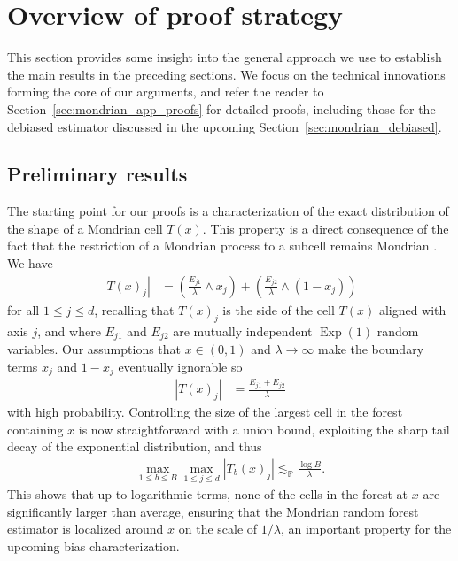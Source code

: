 \documentclass[11pt,lof]{puthesis}
\renewcommand{\P}{\ensuremath{\mathbb{P}}}
\DeclareMathOperator{\Exp}{Exp}
\theoremstyle{break}
\theoremstyle{proof}
\begin{document}
\section{Overview of proof strategy}%
\label{sec:mondrian_overview_proofs}

This section provides some insight into the general approach we use to
establish the main results in the preceding sections. We focus on the technical
innovations forming the core of our arguments, and refer the reader to
Section~\ref{sec:mondrian_app_proofs} for detailed proofs, including those for
the
debiased estimator discussed in the upcoming
Section~\ref{sec:mondrian_debiased}.

\subsection*{Preliminary results}

The starting point for our proofs is a characterization of the exact
distribution of the shape of a Mondrian cell $T(x)$. This property is a direct
consequence of the fact that the restriction of a Mondrian process to a subcell
remains Mondrian \citep[Fact~2]{mourtada2020minimax}. We have
%
\begin{align*}
|T(x)_j|
&= \left( \frac{E_{j1}}{\lambda} \wedge x_j \right)
+ \left( \frac{E_{j2}}{\lambda} \wedge (1-x_j) \right)
\end{align*}
%
for all $1 \leq j \leq d$, recalling that $T(x)_j$ is the side of the cell
$T(x)$ aligned with axis $j$, and where $E_{j1}$ and $E_{j2}$ are mutually
independent $\Exp(1)$ random variables. Our assumptions that $x \in (0,1)$ and
$\lambda \to \infty$ make the boundary terms $x_j$ and $1-x_j$
eventually ignorable so
%
\begin{align*}
|T(x)_j| &= \frac{E_{j1} + E_{j2}}{\lambda}
\end{align*}
%
with high probability. Controlling the size of the largest cell in the forest
containing $x$ is now straightforward with a union bound, exploiting the sharp
tail decay of the exponential distribution, and thus
%
\begin{align*}
\max_{1 \leq b \leq B} \max_{1 \leq j \leq d} |T_b(x)_j|
\lesssim_\P \frac{\log B}{\lambda}.
\end{align*}
%
This shows that up to logarithmic terms, none of the cells in the forest at $x$
are significantly larger than average, ensuring that the Mondrian random forest
estimator is localized around $x$ on the scale of $1/\lambda$, an important
property for the upcoming bias characterization.
\end{document}
